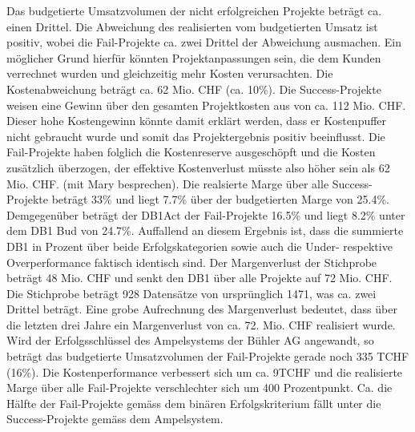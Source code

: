 \newline Das budgetierte Umsatzvolumen der nicht erfolgreichen Projekte beträgt ca. einen Drittel. Die Abweichung des realisierten vom budgetierten Umsatz ist positiv, wobei die Fail-Projekte ca. zwei Drittel der Abweichung ausmachen. Ein möglicher Grund hierfür könnten Projektanpassungen sein, die dem Kunden verrechnet wurden und gleichzeitig mehr Kosten verursachten. Die Kostenabweichung beträgt ca. 62 Mio. CHF (ca. 10\%). Die Success-Projekte weisen eine Gewinn über den gesamten Projektkosten aus von ca. 112 Mio. CHF. Dieser hohe Kostengewinn könnte damit erklärt werden, dass er Kostenpuffer nicht gebraucht wurde und somit das Projektergebnis positiv beeinflusst. Die Fail-Projekte haben folglich die Kostenreserve ausgeschöpft und die Kosten zusätzlich überzogen, der effektive Kostenverlust müsste also höher sein als 62 Mio. CHF. (mit Mary besprechen). Die realsierte Marge über alle Success-Projekte beträgt 33\% und liegt 7.7\% über der budgetierten Marge von 25.4\%. Demgegenüber beträgt der DB1Act der Fail-Projekte 16.5\% und liegt 8.2\% unter dem DB1 Bud von 24.7\%. Auffallend an diesem Ergebnis ist, dass die summierte DB1 in Prozent über beide Erfolgskategorien sowie auch die Under- respektive Overperformance faktisch identisch sind. Der Margenverlust der Stichprobe beträgt 48 Mio. CHF und senkt den DB1 über alle Projekte auf 72 Mio. CHF. Die Stichprobe beträgt 928 Datensätze von ursprünglich 1471, was ca. zwei Drittel beträgt. Eine grobe Aufrechnung des Margenverlust bedeutet, dass über die letzten drei Jahre ein Margenverlust von ca. 72. Mio. CHF realisiert wurde. 
\newline Wird der Erfolgsschlüssel des Ampelsystems der Bühler AG angewandt, so beträgt das budgetierte Umsatzvolumen der Fail-Projekte gerade noch 335 TCHF (16\%). Die Kostenperformance verbessert sich um ca. 9TCHF und die realisierte Marge über alle Fail-Projekte verschlechter sich um 400 Prozentpunkt. Ca. die Hälfte der Fail-Projekte gemäss dem binären Erfolgskriterium fällt unter die Success-Projekte gemäss dem Ampelsystem. 
